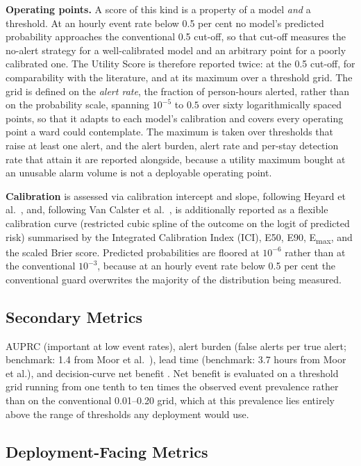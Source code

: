 \textbf{Operating points.} A score of this kind is a property of a model
\emph{and} a threshold. At an hourly event rate below 0.5 per cent no model's
predicted probability approaches the conventional 0.5 cut-off, so that cut-off
measures the no-alert strategy for a well-calibrated model and an arbitrary
point for a poorly calibrated one. The Utility Score is therefore reported
twice: at the 0.5 cut-off, for comparability with the literature, and at its
maximum over a threshold grid. The grid is defined on the \emph{alert rate}, the fraction of person-hours alerted, rather than on the probability scale,
spanning $10^{-5}$ to $0.5$ over sixty logarithmically spaced points, so that
it adapts to each model's calibration and covers every operating point a ward
could contemplate. The maximum is taken over thresholds that raise at least one
alert, and the alert burden, alert rate and per-stay detection rate that attain
it are reported alongside, because a utility maximum bought at an unusable
alarm volume is not a deployable operating point.

\textbf{Calibration} is assessed via calibration intercept and slope, following
Heyard et al.\ \cite{heyard2020evaluation}, and, following Van Calster et al.\
\cite{vancalster2019calibration}, is additionally reported as a flexible
calibration curve (restricted cubic spline of the outcome on the logit of
predicted risk) summarised by the Integrated Calibration Index (ICI), E50, E90,
E\textsubscript{max}, and the scaled Brier score. Predicted probabilities are
floored at $10^{-6}$ rather than at the conventional $10^{-3}$, because at an
hourly event rate below 0.5 per cent the conventional guard overwrites the
majority of the distribution being measured.

\subsection{Secondary Metrics}

AUPRC (important at low event rates), alert burden (false alerts per true alert;
benchmark: 1.4 from Moor et al.\ \cite{moor2023review}), lead time
(benchmark: 3.7 hours from Moor et al.), and decision-curve net benefit
\cite{vickers2006dca}. Net benefit is evaluated on a threshold grid running
from one tenth to ten times the observed event prevalence rather than on the
conventional 0.01--0.20 grid, which at this prevalence lies entirely above the
range of thresholds any deployment would use.

\subsection{Deployment-Facing Metrics}
\label{sec:deployment_metrics}


